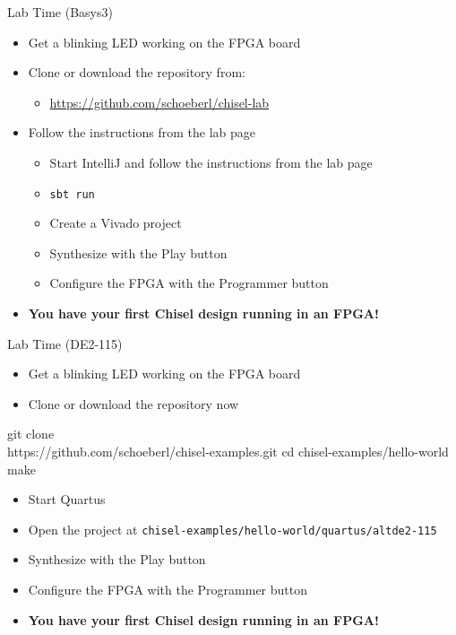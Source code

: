 \documentclass[xcolor=pdflatex,dvipsnames,table]{beamer}
\newcommand{\code}[1]{{\texttt{#1}}}
\begin{document}
\begin{frame}[fragile]{Lab Time (Basys3)}
\begin{itemize}
\item Get a blinking LED working on the FPGA board
\item Clone or download the repository from:
\begin{itemize}
\item \url{https://github.com/schoeberl/chisel-lab}
\end{itemize}
\item Follow the instructions from the lab page
\begin{itemize}
\item Start IntelliJ and follow the instructions from the lab page
\item \code{sbt run}
\item Create a Vivado project
\item Synthesize with the Play button
\item Configure the FPGA with the Programmer button
\end{itemize}
\item {\bf You have your first Chisel design running in an FPGA!}
\end{itemize}
\end{frame}

\begin{frame}[fragile]{Lab Time (DE2-115)}
\begin{itemize}
\item Get a blinking LED working on the FPGA board
\item Clone or download the repository now
\end{itemize}
\begin{chisel}
git clone \\
   https://github.com/schoeberl/chisel-examples.git
cd chisel-examples/hello-world
make
\end{chisel}
\begin{itemize}
\item Start Quartus
\item Open the project at \code{chisel-examples/hello-world/quartus/altde2-115}
\item Synthesize with the Play button
\item Configure the FPGA with the Programmer button
\item {\bf You have your first Chisel design running in an FPGA!}
\end{itemize}
\end{frame}
\end{document}
